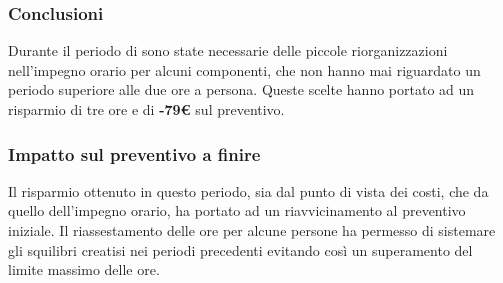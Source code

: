 \subsubsection{Conclusioni}
Durante il periodo di \PA{} sono state necessarie delle piccole riorganizzazioni nell'impegno orario per alcuni componenti, che non hanno mai riguardato un periodo superiore alle due ore a persona.
Queste scelte hanno portato ad un risparmio di tre ore e di \textbf{-79€} sul preventivo.
\subsubsection{Impatto sul preventivo a finire}
Il risparmio ottenuto in questo periodo, sia dal punto di vista dei costi, che da quello dell'impegno orario, ha portato ad un riavvicinamento al preventivo iniziale. Il riassestamento delle ore per alcune persone ha permesso di sistemare gli squilibri creatisi nei periodi precedenti evitando così un superamento del limite massimo delle ore.